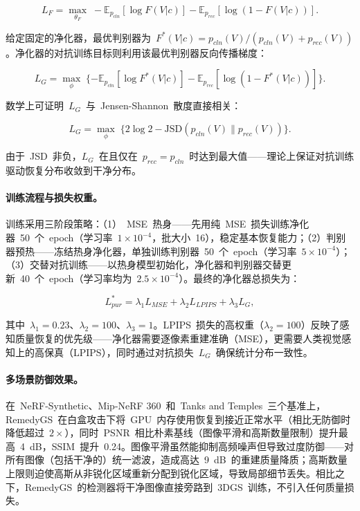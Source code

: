 \begin{equation}
L_F = \max_{\theta_F}\; -\mathbb{E}_{p_{cln}}[\log F(V|c)] - \mathbb{E}_{p_{rec}}[\log(1 - F(V|c))].
\end{equation}

给定固定的净化器，最优判别器为~$F^*(V|c) = p_{cln}(V) / (p_{cln}(V) + p_{rec}(V))$。净化器的对抗训练目标则利用该最优判别器反向传播梯度：

\begin{equation}
L_G = \max_\phi\; \{-\mathbb{E}_{p_{cln}}[\log F^*(V|c)] - \mathbb{E}_{p_{rec}}[\log(1 - F^*(V|c))]\}.
\end{equation}

数学上可证明~$L_G$~与~Jensen-Shannon~散度直接相关：

\begin{equation}
L_G = \max_\phi\; \{2\log 2 - \mathrm{JSD}(p_{cln}(V) \| p_{rec}(V))\}.
\end{equation}

由于~JSD~非负，$L_G$~在且仅在~$p_{rec} = p_{cln}$~时达到最大值——理论上保证对抗训练驱动恢复分布收敛到干净分布。

\paragraph{训练流程与损失权重。}
训练采用三阶段策略：（1）~MSE~热身——先用纯~MSE~损失训练净化器~50~个~epoch（学习率~$1 \times 10^{-4}$，批大小~16），稳定基本恢复能力；（2）判别器预热——冻结热身净化器，单独训练判别器~50~个~epoch（学习率~$5 \times 10^{-4}$）；（3）交替对抗训练——以热身模型初始化，净化器和判别器交替更新~40~个~epoch（学习率均为~$2.5 \times 10^{-4}$）。最终的净化器总损失为：

\begin{equation}
L_{pur}^* = \lambda_1 L_{MSE} + \lambda_2 L_{LPIPS} + \lambda_3 L_G,
\end{equation}

其中~$\lambda_1 = 0.23$、$\lambda_2 = 100$、$\lambda_3 = 1$。LPIPS~损失的高权重（$\lambda_2 = 100$）反映了感知质量恢复的优先级——净化器需要逐像素重建准确（MSE），更需要人类视觉感知上的高保真（LPIPS），同时通过对抗损失~$L_G$~确保统计分布一致性。

\paragraph{多场景防御效果。}
在~NeRF-Synthetic、Mip-NeRF 360~和~Tanks and Temples~三个基准上，RemedyGS~在白盒攻击下将~GPU~内存使用恢复到接近正常水平（相比无防御时降低超过~$2\times$），同时~PSNR~相比朴素基线（图像平滑和高斯数量限制）提升最高~4~dB，SSIM~提升~0.24。图像平滑虽然能抑制高频噪声但导致过度防御——对所有图像（包括干净的）统一滤波，造成高达~9~dB~的重建质量降质；高斯数量上限则迫使高斯从非锐化区域重新分配到锐化区域，导致局部细节丢失。相比之下，RemedyGS~的检测器将干净图像直接旁路到~3DGS~训练，不引入任何质量损失。

